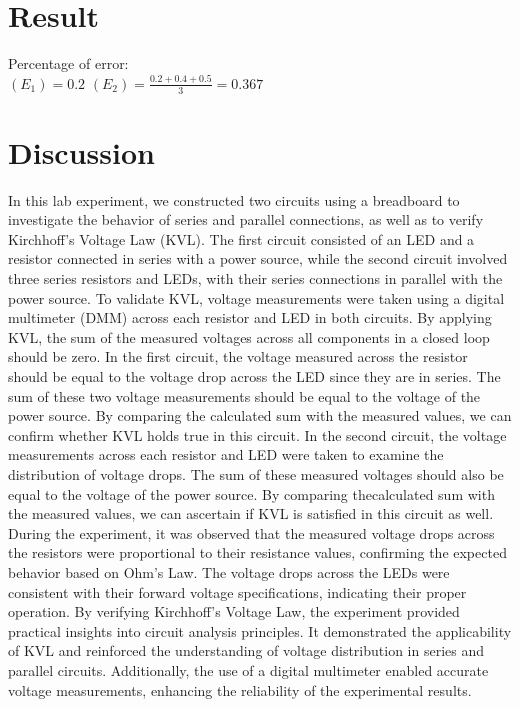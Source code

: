 \section{Result}
Percentage of error: \\
$(E_1) = 0.2$
$(E_2) = \frac{0.2+0.4+0.5}{3} = 0.367$

\section{Discussion}
In this lab experiment, we constructed two circuits using a breadboard to
investigate the behavior of series and parallel connections, as well as to verify
Kirchhoff's Voltage Law (KVL). The first circuit consisted of an LED and a
resistor connected in series with a power source, while the second circuit involved
three series resistors and LEDs, with their series connections in parallel with the
power source.
To validate KVL, voltage measurements were taken using a digital multimeter
(DMM) across each resistor and LED in both circuits. By applying KVL, the sum
of the measured voltages across all components in a closed loop should be zero.
In the first circuit, the voltage measured across the resistor should be equal to the
voltage drop across the LED since they are in series. The sum of these two voltage
measurements should be equal to the voltage of the power source. By comparing
the calculated sum with the measured values, we can confirm whether KVL holds
true in this circuit.
In the second circuit, the voltage measurements across each resistor and LED were
taken to examine the distribution of voltage drops. The sum of these measured
voltages should also be equal to the voltage of the power source. By comparing thecalculated sum with the measured values, we can ascertain if KVL is satisfied in
this circuit as well.
During the experiment, it was observed that the measured voltage drops across the
resistors were proportional to their resistance values, confirming the expected
behavior based on Ohm's Law. The voltage drops across the LEDs were consistent
with their forward voltage specifications, indicating their proper operation.
By verifying Kirchhoff's Voltage Law, the experiment provided practical insights
into circuit analysis principles. It demonstrated the applicability of KVL and
reinforced the understanding of voltage distribution in series and parallel circuits.
Additionally, the use of a digital multimeter enabled accurate voltage
measurements, enhancing the reliability of the experimental results.

